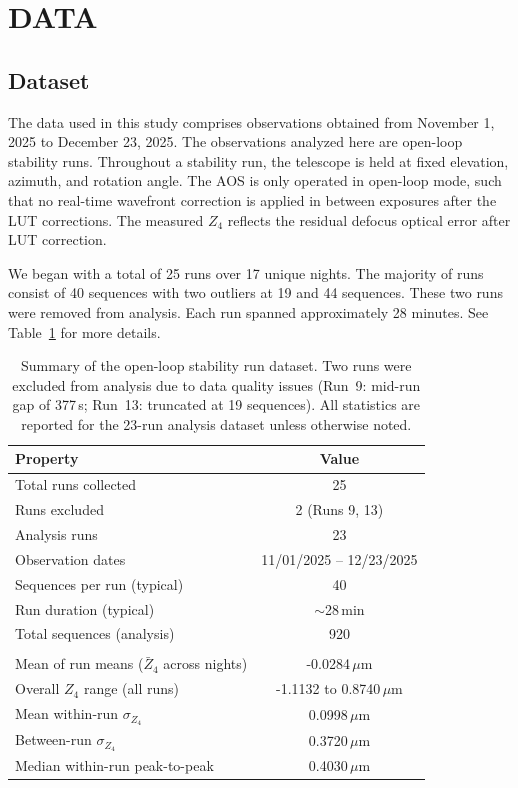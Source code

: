 \documentclass[SE,authoryear,toc]{lsstdoc}
\begin{document}
\section{DATA}
\label{sec:Data}

\subsection{Dataset}
\label{subsec:Dataset}
The data used in this study comprises observations obtained from November 1, 2025 to December 23, 2025. The observations analyzed here are open-loop stability runs. Throughout a stability run, the telescope is held at fixed elevation, azimuth, and rotation angle. The AOS is only operated in open-loop mode, such that no real-time wavefront correction is applied in between exposures after the LUT corrections. The measured $Z_4$ reflects the residual defocus optical error after LUT correction. 

We began with a total of 25 runs over 17 unique nights. The majority of runs consist of 40 sequences with two outliers at 19 and 44 sequences. These two runs were removed from analysis. Each run spanned approximately 28 minutes. See Table~\ref{tab:dataset_summary} for more details.

\begin{table}[htbp]
\centering
\caption{Summary of the open-loop stability run dataset. Two runs were
excluded from analysis due to data quality issues (Run~9: mid-run gap
of 377\,s; Run~13: truncated at 19 sequences). All statistics are
reported for the 23-run analysis dataset unless otherwise noted.}
\label{tab:dataset_summary}
\begin{tabular}{lc}
\toprule
\textbf{Property} & \textbf{Value} \\
\midrule
Total runs collected          & 25 \\
Runs excluded                 & 2 (Runs 9, 13) \\
Analysis runs                 & 23 \\
Observation dates             & 11/01/2025 -- 12/23/2025 \\
Sequences per run (typical)   & 40 \\
Run duration (typical)        & $\sim$28\,min \\
Total sequences (analysis)    & 920 \\
\addlinespace
\midrule
\multicolumn{2}{l}{\textit{$Z_4$ statistics (23-run analysis dataset)}} \\
Mean of run means ($\bar{Z}_4$ across nights)  & -0.0284\,$\mu$m \\
Overall $Z_4$ range (all runs)                  & -1.1132 to 0.8740\,$\mu$m \\
Mean within-run $\sigma_{Z_4}$     & 0.0998\,$\mu$m \\
Between-run $\sigma_{Z_4}$         & 0.3720\,$\mu$m \\
Median within-run peak-to-peak     & 0.4030\,$\mu$m \\
\bottomrule
\end{tabular}
\end{table}
\end{document}
